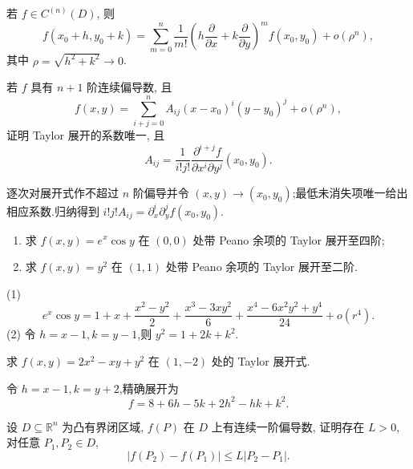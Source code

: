 \begin{theorem}
    若 $f\in C^{(n)}(D)$, 则
    \[
        f(x_0+h,y_0+k)
        =\sum\limits_{m=0}^n\dfrac{1}{m!}
        \left(h\dfrac{\partial}{\partial x}+k\dfrac{\partial}{\partial y}\right)^m f(x_0,y_0)
        +o(\rho^n),
    \]
    其中 $\rho=\sqrt{h^2+k^2}\to0$.
\end{theorem}

\begin{example}[\markstar]
    若 $f$ 具有 $n+1$ 阶连续偏导数, 且
    \[
        f(x,y)=\sum\limits_{i+j=0}^nA_{ij}(x-x_0)^i(y-y_0)^j+o(\rho^n),
    \]
    证明 Taylor 展开的系数唯一, 且
    \[
        A_{ij}=\dfrac{1}{i!j!}
        \dfrac{\partial^{i+j}f}{\partial x^i\partial y^j}(x_0,y_0).
    \]
\end{example}
\exampleblank

\begin{solution}
    逐次对展开式作不超过 $n$ 阶偏导并令 $(x,y)\to(x_0,y_0)$;最低未消失项唯一给出相应系数.归纳得到 $i!j!A_{ij}=\partial_x^i\partial_y^jf(x_0,y_0)$.
\end{solution}

\begin{example}
    \begin{enumerate}
        \item 求 $f(x,y)=e^x\cos y$ 在 $(0,0)$ 处带 Peano 余项的 Taylor 展开至四阶;
        \item 求 $f(x,y)=y^2$ 在 $(1,1)$ 处带 Peano 余项的 Taylor 展开至二阶.
    \end{enumerate}
\end{example}
\exampleblank

\begin{solution}
    (1)
    \[
        e^x\cos y=1+x+\dfrac{x^2-y^2}{2}+\dfrac{x^3-3xy^2}{6}
        +\dfrac{x^4-6x^2y^2+y^4}{24}+o(r^4).
    \]
    (2) 令 $h=x-1,k=y-1$,则 $y^2=1+2k+k^2$.
\end{solution}

\begin{example}
    求 $f(x,y)=2x^2-xy+y^2$ 在 $(1,-2)$ 处的 Taylor 展开式.
\end{example}
\exampleblank

\begin{solution}
    令 $h=x-1,k=y+2$,精确展开为
    \[
        f=8+6h-5k+2h^2-hk+k^2.
    \]
\end{solution}

\begin{example}
    设 $D\subseteq\mathbb{R}^n$ 为凸有界闭区域, $f(P)$ 在 $D$ 上有连续一阶偏导数, 证明存在 $L>0$, 对任意 $P_1,P_2\in D$,
    \[
        |f(P_2)-f(P_1)|\leq L|P_2-P_1|.
    \]
\end{example}
\exampleblank

